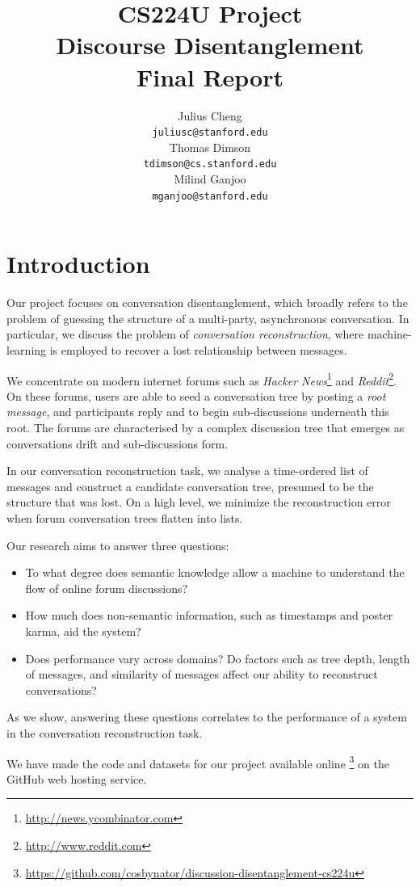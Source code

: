 \documentclass{article}
\title{{\small CS224U Project} \\ Discourse Disentanglement \\ \small{Final Report}}
\author{Julius Cheng \\
  {\tt juliusc@stanford.edu}
  \\\And
  Thomas Dimson  \\
  {\tt tdimson@cs.stanford.edu}
  \\\AND
  Milind Ganjoo \\
  {\tt mganjoo@stanford.edu}
}
\date{}
\begin{document}
\maketitle

\section{Introduction}
Our project focuses on conversation disentanglement, which broadly refers to
the problem of guessing the structure of a multi-party, asynchronous
conversation. In particular, we discuss the problem of \textit{conversation
reconstruction}, where machine-learning is employed to recover a lost
relationship between messages.

We concentrate on modern internet forums such as 
\textit{Hacker News}\footnote{\url{http://news.ycombinator.com}} 
and \textit{Reddit}\footnote{\url{http://www.reddit.com}}. 
On these forums, users are able to seed a conversation tree by posting a 
\textit{root message}, and participants reply and to begin sub-discussions 
underneath this root. The forums are characterised by a complex 
discussion tree that emerges as conversations drift and sub-discussions form.

In our conversation reconstruction task, we analyse a time-ordered list
of messages and construct a candidate conversation tree, presumed to be the structure
that was lost. On a high level, we minimize the reconstruction
error when forum conversation trees flatten into lists.

Our research aims to answer three questions:
\begin{itemize}
  \item To what degree does semantic knowledge allow a machine to understand the 
    flow of online forum discussions?
  \item How much does non-semantic information, such as timestamps and poster karma,
    aid the system?
  \item Does performance vary across domains? Do factors such as tree depth,
    length of messages, and similarity of messages affect our ability to
    reconstruct conversations? 
\end{itemize}

As we show, answering these questions correlates to the performance of a system
in the conversation reconstruction task. 

We have made the code and datasets for our project available online
\footnote{\url{https://github.com/cosbynator/discussion-disentanglement-cs224u}} on the
GitHub web hosting service.
\end{document}
